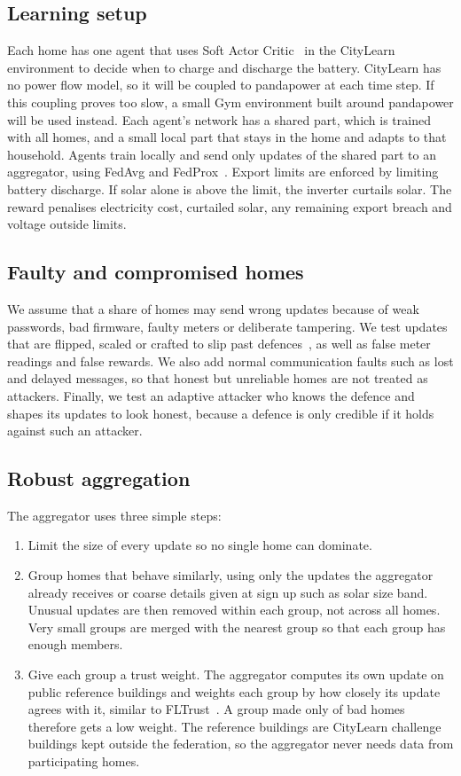 \documentclass[11pt,a4paper]{article}
\begin{document}
\subsection{Learning setup}
Each home has one agent that uses Soft Actor Critic~\cite{haarnoja2018} in the CityLearn environment to decide when to charge and discharge the battery. CityLearn has no power flow model, so it will be coupled to pandapower at each time step. If this coupling proves too slow, a small Gym environment built around pandapower will be used instead. Each agent's network has a shared part, which is trained with all homes, and a small local part that stays in the home and adapts to that household. Agents train locally and send only updates of the shared part to an aggregator, using FedAvg and FedProx~\cite{li2020fedprox}. Export limits are enforced by limiting battery discharge. If solar alone is above the limit, the inverter curtails solar. The reward penalises electricity cost, curtailed solar, any remaining export breach and voltage outside limits.

\subsection{Faulty and compromised homes}
We assume that a share of homes may send wrong updates because of weak passwords, bad firmware, faulty meters or deliberate tampering. We test updates that are flipped, scaled or crafted to slip past defences~\cite{fang2025}, as well as false meter readings and false rewards. We also add normal communication faults such as lost and delayed messages, so that honest but unreliable homes are not treated as attackers. Finally, we test an adaptive attacker who knows the defence and shapes its updates to look honest, because a defence is only credible if it holds against such an attacker.

\subsection{Robust aggregation}
The aggregator uses three simple steps:
\begin{enumerate}
  \item Limit the size of every update so no single home can dominate.
  \item Group homes that behave similarly, using only the updates the aggregator already receives or coarse details given at sign up such as solar size band. Unusual updates are then removed within each group, not across all homes. Very small groups are merged with the nearest group so that each group has enough members.
  \item Give each group a trust weight. The aggregator computes its own update on public reference buildings and weights each group by how closely its update agrees with it, similar to FLTrust~\cite{cao2021fltrust}. A group made only of bad homes therefore gets a low weight. The reference buildings are CityLearn challenge buildings kept outside the federation, so the aggregator never needs data from participating homes.
\end{enumerate}
\end{document}
